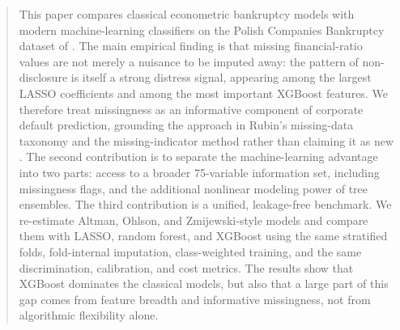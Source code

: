 \documentclass[12pt,a4paper]{article}
\begin{document}
\newpage
\begin{abstract}
\noindent
This paper compares classical econometric bankruptcy models with modern
machine-learning classifiers on the Polish Companies Bankruptcy dataset of
\cite{zieba2016}. The main empirical finding is that missing financial-ratio
values are not merely a nuisance to be imputed away: the pattern of
non-disclosure is itself a strong distress signal, appearing among the largest
LASSO coefficients and among the most important XGBoost features. We therefore treat missingness as an informative component of corporate
default prediction, grounding the approach in Rubin's missing-data taxonomy
and the missing-indicator method rather than claiming it as new
\citep{rubin1976,jones1996}. The second contribution is to separate the
machine-learning advantage into two parts: access to a broader 75-variable
information set, including missingness flags, and the additional nonlinear
modeling power of tree ensembles. The third contribution is a unified,
leakage-free benchmark. We re-estimate Altman, Ohlson, and Zmijewski-style
models and compare them with LASSO, random forest, and XGBoost using the same
stratified folds, fold-internal imputation, class-weighted training, and the
same discrimination, calibration, and cost metrics. The results show that
XGBoost dominates the classical models, but also that a large part of this gap
comes from feature breadth and informative missingness, not from algorithmic
flexibility alone.
\end{abstract}
\end{document}
